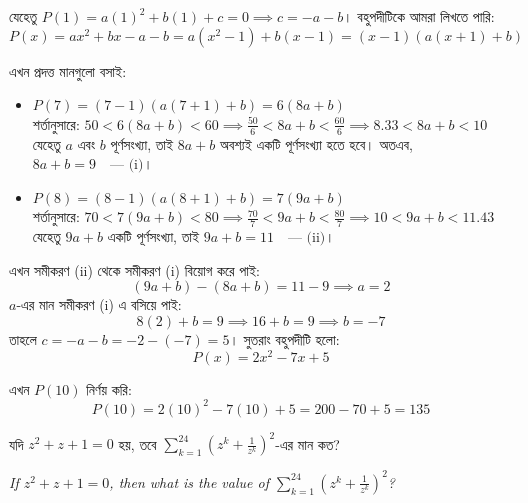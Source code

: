 \documentclass[12pt, a4paper]{article}
\begin{document}
\begin{tcolorbox}[solutionbox={সমাধান (Solution)}]
    \noindent
    যেহেতু $P(1) = a(1)^2 + b(1) + c = 0 \implies c = -a-b$। 
    বহুপদীটিকে আমরা লিখতে পারি:
    \[ P(x) = ax^2 + bx - a - b = a(x^2-1) + b(x-1) = (x-1)(a(x+1) + b) \]
    
    \vspace{0.5em}
    এখন প্রদত্ত মানগুলো বসাই:
    \begin{itemize}[itemsep=0.4em]
        \item $P(7) = (7-1)(a(7+1) + b) = 6(8a + b)$ \\
        শর্তানুসারে: $50 < 6(8a + b) < 60 \implies \frac{50}{6} < 8a+b < \frac{60}{6} \implies 8.33 < 8a+b < 10$ \\
        যেহেতু $a$ এবং $b$ পূর্ণসংখ্যা, তাই $8a+b$ অবশ্যই একটি পূর্ণসংখ্যা হতে হবে। অতএব, $8a+b = 9 \quad \text{--- (i)}$।
        
        \item $P(8) = (8-1)(a(8+1) + b) = 7(9a + b)$ \\
        শর্তানুসারে: $70 < 7(9a + b) < 80 \implies \frac{70}{7} < 9a+b < \frac{80}{7} \implies 10 < 9a+b < 11.43$ \\
        যেহেতু $9a+b$ একটি পূর্ণসংখ্যা, তাই $9a+b = 11 \quad \text{--- (ii)}$।
    \end{itemize}
    
    \vspace{0.5em}
    এখন সমীকরণ (ii) থেকে সমীকরণ (i) বিয়োগ করে পাই:
    \[ (9a+b) - (8a+b) = 11 - 9 \implies a = 2 \]
    $a$-এর মান সমীকরণ (i) এ বসিয়ে পাই:
    \[ 8(2) + b = 9 \implies 16 + b = 9 \implies b = -7 \]
    তাহলে $c = -a-b = -2 - (-7) = 5$। 
    সুতরাং বহুপদীটি হলো:
    \[ P(x) = 2x^2 - 7x + 5 \]
    
    \vspace{0.5em}
    এখন $P(10)$ নির্ণয় করি:
    \[ P(10) = 2(10)^2 - 7(10) + 5 = 200 - 70 + 5 = 135 \]
\end{tcolorbox}
\begin{tcolorbox}[questionbox={প্রশ্ন (Question) 33}]
    \noindent
    যদি $z^2 + z + 1 = 0$ হয়, তবে $\sum_{k=1}^{24} \left(z^k + \frac{1}{z^k}\right)^2$-এর মান কত?
    
    \vspace{0.8em}
    \begin{english}
    \noindent\textit{\color{darkgray}
    If $z^2 + z + 1 = 0$, then what is the value of $\sum_{k=1}^{24} \left(z^k + \frac{1}{z^k}\right)^2$?
    }
    \end{english}
\end{tcolorbox}
\end{document}
